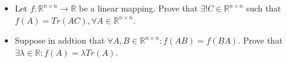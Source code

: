 \begin{itemize}
\item[(a)] Let \(f\colon  \mathbb{R}^{n\times n}\to\mathbb{R}\) be a linear mapping. Prove that \(\exists ! C\in\mathbb{R}^{n\times n}\) such that \(f(A)=Tr(AC), \forall A \in \mathbb{R}^{n\times n}\).

\item[(b)] Suppose in addtion that \(\forall A,B \in \mathbb{R}^{n\times n}: f(AB)=f(BA)\). Prove that \(\exists \lambda \in \mathbb{R}: f(A)=\lambda Tr(A)\).
\end{itemize}
